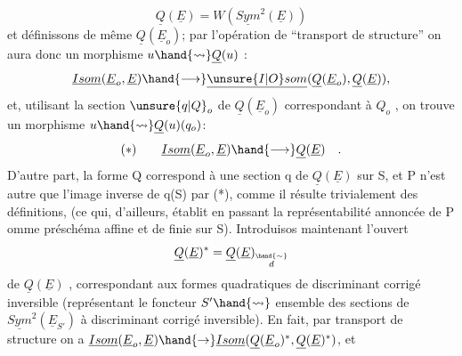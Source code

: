 
\[ \underline{Q}(\underline{E}) =W(\underline{Sym}^2(\underline{E})) \]
et définissons de même $\underline{Q}(\underline{E}_o)$; par l'opération de ``transport de
structure'' on aura donc un morphisme $u \hand{\rightsquigarrow} \underline{Q}(u)$ :
\[ \underline{Isom}(\underline{E}_o,\underline{E}) \hand{\longrightarrow} \underline{\unsure{I|O}som}(\underline{Q}(\underline{E}_o),\underline{Q}(\underline{E})), \]
et, utilisant la section $\unsure{q|Q}_o$ de $\underline{Q}(\underline{E}_o)$ correspondant à $Q_o$ , on trouve un
morphisme $u \hand{\rightsquigarrow} \underline{Q}(u)(q_o)$:
\[ (*) \qquad \underline{Isom}(\underline{E}_o,\underline{E}) \hand{\longrightarrow} \underline{Q}(\underline{E}) \quad . \]
D'autre part, la forme Q  correspond à une section q de $\underline{Q}(\underline{E})$ sur S,
et P n'est autre que l'image inverse de q(S) par (*), comme il résulte
trivialement des définitions, (ce qui, d'ailleurs, établit en passant la
représentabilité annoncée de P omme préschéma affine et de  finie
sur S). Introduisos maintenant l'ouvert 
\[ \underline{Q}(\underline{E})^* = \underline{Q}(\underline{E})_{\overset{\hand{\sim}}{d}} \]
de $\underline{Q}(\underline{E})$ , correspondant aux formes quadratiques de discriminant corrigé
inversible (représentant le foncteur $S' \hand{\rightsquigarrow}$ ensemble des 
sections de $\underline{Sym}^2(\underline{E}_{S'})$ à discriminant corrigé inversible). En fait,
par transport de structure on a $\underline{Isom}(\underline{E}_o,\underline{E}) \hand{\rightarrow} \underline{Isom}(\underline{Q}(\underline{E}_o)^*,\underline{Q}(\underline{E})^*)$, et
